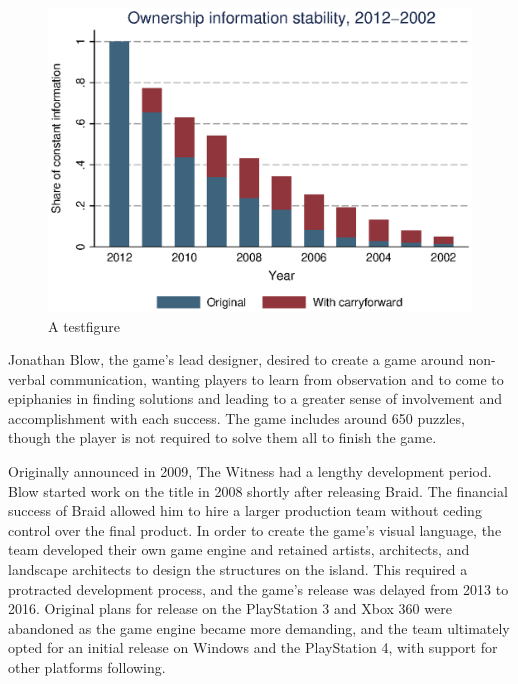 \documentclass[11pt,a4paper]{scrartcl}
\begin{document}
\begin{figure}[htp]
	\centering
		\includegraphics[width=\textwidth]{input/testfigure.eps} %
	\caption{A testfigure}
	\label{fig:testfigure} %
\end{figure}

Jonathan Blow, the game's lead designer, desired to create a game around non-verbal communication, wanting players to learn from observation and to come to epiphanies in finding solutions and leading to a greater sense of involvement and accomplishment with each success. The game includes around 650 puzzles, though the player is not required to solve them all to finish the game.

Originally announced in 2009, The Witness had a lengthy development period. Blow started work on the title in 2008 shortly after releasing Braid. The financial success of Braid allowed him to hire a larger production team without ceding control over the final product. In order to create the game's visual language, the team developed their own game engine and retained artists, architects, and landscape architects to design the structures on the island. This required a protracted development process, and the game's release was delayed from 2013 to 2016. Original plans for release on the PlayStation 3 and Xbox 360 were abandoned as the game engine became more demanding, and the team ultimately opted for an initial release on Windows and the PlayStation 4, with support for other platforms following.
\end{document}
